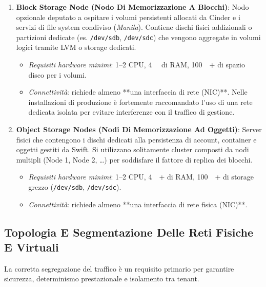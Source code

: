 \documentclass[11pt, a4paper]{article}
\begin{document}
\begin{enumerate}
    \item \textbf{Block Storage Node (Nodo Di Memorizzazione A Blocchi)}:
    Nodo opzionale deputato a ospitare i volumi persistenti allocati da Cinder e i servizi di file system condiviso (\emph{Manila}). Contiene dischi fisici addizionali o partizioni dedicate (es. \texttt{/dev/sdb}, \texttt{/dev/sdc}) che vengono aggregate in volumi logici tramite LVM o storage dedicati.
    \begin{itemize}[noitemsep]
        \item \emph{Requisiti hardware minimi}: 1--2 CPU, \SI{4}{\giga\byte} di RAM, \SI{100}{\giga\byte}+ di spazio disco per i volumi.
        \item \emph{Connettività}: richiede almeno **una interfaccia di rete (NIC)**. Nelle installazioni di produzione è fortemente raccomandato l'uso di una rete dedicata isolata per evitare interferenze con il traffico di gestione.
    \end{itemize}

    \item \textbf{Object Storage Nodes (Nodi Di Memorizzazione Ad Oggetti)}:
    Server fisici che contengono i dischi dedicati alla persistenza di account, container e oggetti gestiti da Swift. Si utilizzano solitamente cluster composti da nodi multipli (Node 1, Node 2, \dots) per soddisfare il fattore di replica dei blocchi.
    \begin{itemize}[noitemsep]
        \item \emph{Requisiti hardware minimi}: 1--2 CPU, \SI{4}{\giga\byte}+ di RAM, \SI{100}{\giga\byte}+ di storage grezzo (\texttt{/dev/sdb}, \texttt{/dev/sdc}).
        \item \emph{Connettività}: richiede almeno **una interfaccia di rete fisica (NIC)**.
    \end{itemize}
\end{enumerate}

\subsection{Topologia E Segmentazione Delle Reti Fisiche E Virtuali}

La corretta segregazione del traffico è un requisito primario per garantire sicurezza, determinismo prestazionale e isolamento tra tenant.

\end{document}

